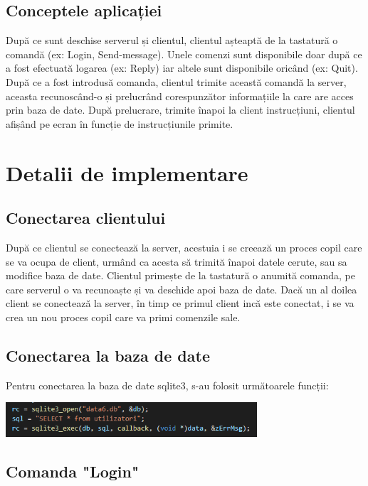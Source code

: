 \documentclass[a4paper,12pt]{article}
\begin{document}
\subsection{Conceptele aplicației}
 \tab
 După ce sunt deschise serverul și clientul, clientul așteaptă de la tastatură o comandă (ex: Login, Send-message). Unele comenzi sunt disponibile doar după ce a fost efectuată logarea (ex: Reply) iar altele sunt disponibile oricând (ex: Quit). După ce a fost introdusă comanda, clientul trimite această comandă la server, aceasta recunoscând-o și prelucrând corespunzător informațiile la care are acces prin baza de date. După prelucrare, trimite înapoi la client instrucțiuni, clientul afișând pe ecran în funcție de instrucțiunile primite.
    
    
\section {Detalii de implementare}

\subsection{Conectarea clientului}

\tab
După ce clientul se conectează la server, acestuia i se creează un proces copil care se va ocupa de client, urmând ca acesta să trimită înapoi datele cerute, sau sa modifice baza de date. Clientul primește de la tastatură o anumită comanda, pe care serverul o va recunoaște și va deschide apoi baza de date.
Dacă un al doilea client se conectează la server, în timp ce primul client incă este conectat, i se va crea un nou proces copil care va primi comenzile sale.

\subsection{Conectarea la baza de date}

\tab 
Pentru conectarea la baza de date sqlite3, s-au folosit următoarele funcții:

\bigskip

\begin{center}
\includegraphics[width=0.7\textwidth]{baze_date.png}
\end{center}

\subsection{Comanda "Login"}
\end{document}
